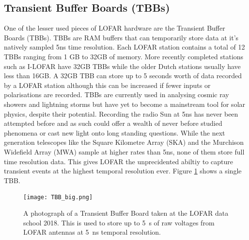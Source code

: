 \subsection{Transient Buffer Boards (TBBs)}
\label{sec:tbb}
One of the lesser used pieces of LOFAR hardware are the Transient Buffer Boards (TBBs). TBBs are RAM buffers that can temporarily store data at it's natively sampled 5ns time resolution. Each LOFAR station contains a total of 12 TBBs ranging from 1 GB to 32GB of memory. More recently completed stations such as I-LOFAR have 32GB TBBs while the older Dutch stations usually have less than 16GB.
A 32GB TBB can store up to 5 seconds worth of data recorded by a LOFAR station although this can be increased if fewer inputs or polarisations are recorded. TBBs are currently used in analysing cosmic ray showers \citep{Mulrey2020} and lightning storms \citep{Hare2018} but have yet to become a mainstream tool for solar physics, despite their potential. 
Recording the radio Sun at 5ns has never been attempted before and as such could offer a wealth of never before studied phenomena or cast new light onto long standing questions.
While the next generation telescopes like the Square Kilometre Array (SKA) and the Murchison Widefield Array (MWA) sample at higher rates than 5ns, none of them store full time resolution data. This gives LOFAR the unprecidented abiltiy to capture transient events at the highest temporal resolution ever. Figure \ref{fig:TBB} shows a single TBB.

\begin{figure}[ht]
\centering
\texttt{[image: TBB\_big.png]}
\caption[A Transient Buffer Board.]{A photograph of a Transient Buffer Board taken at the LOFAR data school 2018. This is used to store up to 5~s of raw voltages from LOFAR antennas at 5~ns temporal resolution.}
\label{fig:TBB}
\end{figure}

